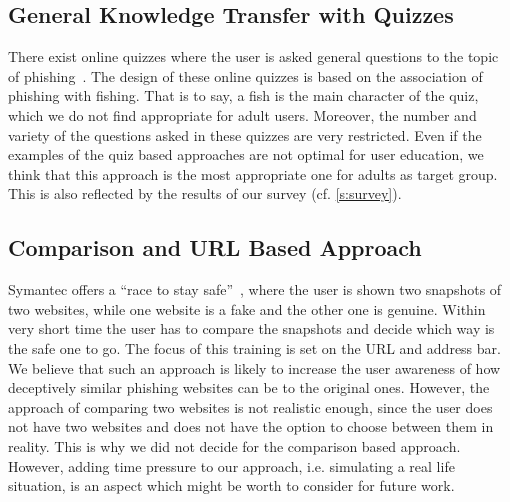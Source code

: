 \subsection{General Knowledge Transfer with Quizzes}
There exist online quizzes where the user is asked general questions to the topic of phishing~\cite{icicibank,onguardonline}. 
The design of these online quizzes is based on the association of phishing with fishing. 
That is to say, a fish is the main character of the quiz, which we do not find appropriate for adult users. 
Moreover, the number and variety of the questions asked in these quizzes are very restricted. 
Even if the examples of the quiz based approaches are not optimal for user education, we think that this approach is the most appropriate one for adults as target group. 
This is also reflected by the results of our survey (cf. \autoref{s:survey}).

\subsection{Comparison and URL Based Approach}
\label{s:comparison_approach}
Symantec offers a ``race to stay safe''~\cite{staysafeonline}, where the user is shown two snapshots of two websites, while one website is a fake and the other one is genuine. 
Within very short time the user has to compare the snapshots and decide which way is the safe one to go. 
The focus of this training is set on the URL and address bar. 
We believe that such an approach is likely to increase the user awareness of how deceptively similar phishing websites can be to the original ones. 
However, the approach of comparing two websites is not realistic enough, since the user does not have two websites and does not have the option to choose between them in reality. 
This is why we did not decide for the comparison based approach. 
However, adding time pressure to our approach, i.e. simulating a real life situation, is an aspect which might be worth to consider for future work.


